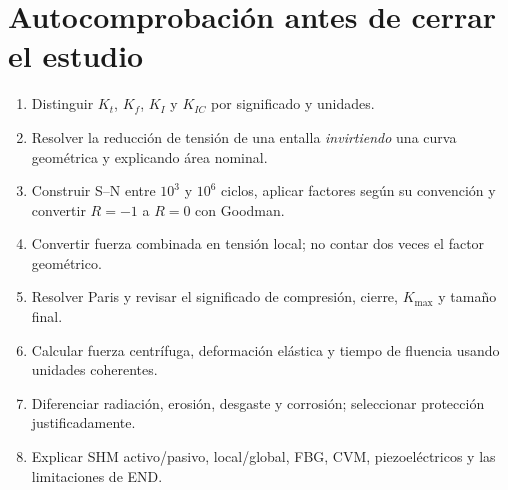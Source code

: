 \section{Autocomprobación antes de cerrar el estudio}
\begin{enumerate}
\item Distinguir $K_t$, $K_f$, $K_I$ y $K_{IC}$ por significado y unidades.
\item Resolver la reducción de tensión de una entalla \emph{invirtiendo} una curva geométrica y explicando área nominal.
\item Construir S--N entre $10^3$ y $10^6$ ciclos, aplicar factores según su convención y convertir $R=-1$ a $R=0$ con Goodman.
\item Convertir fuerza combinada en tensión local; no contar dos veces el factor geométrico.
\item Resolver Paris y revisar el significado de compresión, cierre, $K_{\max}$ y tamaño final.
\item Calcular fuerza centrífuga, deformación elástica y tiempo de fluencia usando unidades coherentes.
\item Diferenciar radiación, erosión, desgaste y corrosión; seleccionar protección justificadamente.
\item Explicar SHM activo/pasivo, local/global, FBG, CVM, piezoeléctricos y las limitaciones de END.
\end{enumerate}
